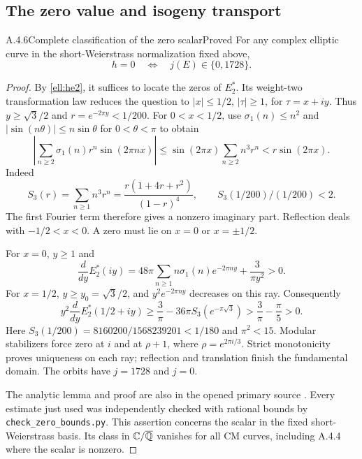 \subsection{The zero value and isogeny transport}

\begin{result}{A.4.6}{Complete classification of the zero scalar}{Proved}
For any complex elliptic curve in the short-Weierstrass normalization fixed above,
\[
 h=0\quad\Longleftrightarrow\quad j(E)\in\{0,1728\}.
\]
\end{result}
\begin{proof}
By \eqref{ell:he2}, it suffices to locate the zeros of $E_2^*$. Its weight-two transformation law reduces the question to $|x|\le1/2$, $|\tau|\ge1$, for $\tau=x+iy$. Thus $y\ge\sqrt3/2$ and $r=e^{-2\pi y}<1/200$. For $0<x<1/2$, use $\sigma_1(n)\le n^2$ and $|\sin(n\theta)|\le n\sin\theta$ for $0<\theta<\pi$ to obtain
\[
 \left|\sum_{n\ge2}\sigma_1(n)r^n\sin(2\pi nx)\right|
 \le\sin(2\pi x)\sum_{n\ge2}n^3r^n
 <r\sin(2\pi x).
\]
Indeed
\[
 S_3(r)=\sum_{n\ge1}n^3r^n=\frac{r(1+4r+r^2)}{(1-r)^4},
 \qquad S_3(1/200)/(1/200)<2.
\]
The first Fourier term therefore gives a nonzero imaginary part. Reflection deals with $-1/2<x<0$. A zero must lie on $x=0$ or $x=\pm1/2$.

For $x=0$, $y\ge1$ and
\[
 \frac d{dy}E_2^*(iy)=48\pi\sum_{n\ge1}n\sigma_1(n)e^{-2\pi ny}
 +\frac3{\pi y^2}>0.
\]
For $x=1/2$, $y\ge y_0=\sqrt3/2$, and $y^2e^{-2\pi ny}$ decreases on this ray. Consequently
\[
 y^2\frac d{dy}E_2^*(1/2+iy)
 \ge\frac3\pi-36\pi S_3(e^{-\pi\sqrt3})
 >\frac3\pi-\frac\pi5>0.
\]
Here $S_3(1/200)=8160200/1568239201<1/180$ and $\pi^2<15$. Modular stabilizers force zero at $i$ and at $\rho+1$, where $\rho=e^{2\pi i/3}$. Strict monotonicity proves uniqueness on each ray; reflection and translation finish the fundamental domain. The orbits have $j=1728$ and $j=0$.

The analytic lemma and proof are also in the opened primary source \cite[Lemma 8.1, printed pp.25--26]{EllSebbarBesrour2026}. Every estimate just used was independently checked with rational bounds by \texttt{check\_zero\_bounds.py}. This assertion concerns the scalar in the fixed short-Weierstrass basis. Its class in $\mathbb C/\overline{\mathbb Q}$ vanishes for all CM curves, including A.4.4 where the scalar is nonzero.
\end{proof}


